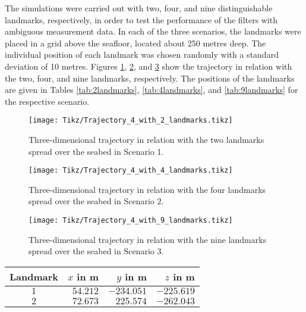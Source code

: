 The simulations were carried out with two, four, and nine distinguishable landmarks, respectively, in order to test the performance of the filters with ambiguous measurement data. In each of the three scenarios, the landmarks were placed in a grid above the seafloor, located about 250 metres deep. The individual position of each landmark was chosen randomly with a standard deviation of 10 metres. Figures \ref{fig:trajectory_4_with_2_landmarks}, \ref{fig:trajectory_4_with_4_landmarks}, and \ref{fig:trajectory_4_with_9_landmarks} show the trajectory in relation with the two, four, and nine landmarks, respectively. The positions of the landmarks are given in Tables \ref{tab:2landmarks}, \ref{tab:4landmarks}, and \ref{tab:9landmarks} for the respective scenario.


\begin{figure}
	\centering
	\setlength\figureheight{0.4\textheight} 	
	\setlength{}		
	\texttt{[image: Tikz/Trajectory\_4\_with\_2\_landmarks.tikz]}			
	\caption{Three-dimensional trajectory in relation with the two landmarks spread over the seabed in Scenario 1.}		
	\label{fig:trajectory_4_with_2_landmarks}			
\end{figure}
  
 \begin{figure}
	\centering
	\setlength\figureheight{0.4\textheight} 	
	\setlength{}		
	\texttt{[image: Tikz/Trajectory\_4\_with\_4\_landmarks.tikz]}			
	\caption{Three-dimensional trajectory in relation with the four landmarks spread over the seabed in Scenario 2.}		
	\label{fig:trajectory_4_with_4_landmarks}			
\end{figure} 

 \begin{figure}
	\centering
	\setlength\figureheight{0.4\textheight} 	
	\setlength{}		
	\texttt{[image: Tikz/Trajectory\_4\_with\_9\_landmarks.tikz]}			
	\caption{Three-dimensional trajectory in relation with the nine landmarks spread over the seabed in Scenario 3.}		
	\label{fig:trajectory_4_with_9_landmarks}			
\end{figure} 
  
\begin{table*}\centering
{}
\begin{tabular}{@{}crrr@{}}\toprule
Landmark & $x$ in m & $y$ in m & $z$ in m \\
\midrule 
$1$ & $54.212$ & $-234.051$ & $-225.619$ \\               
$2$ & $72.673$ & $225.574$ & $-262.043$ \\    
\bottomrule
\end{tabular}
\caption{Positions of the landmarks in Scenario 1.}
\label{tab:2landmarks}
\end{table*}

